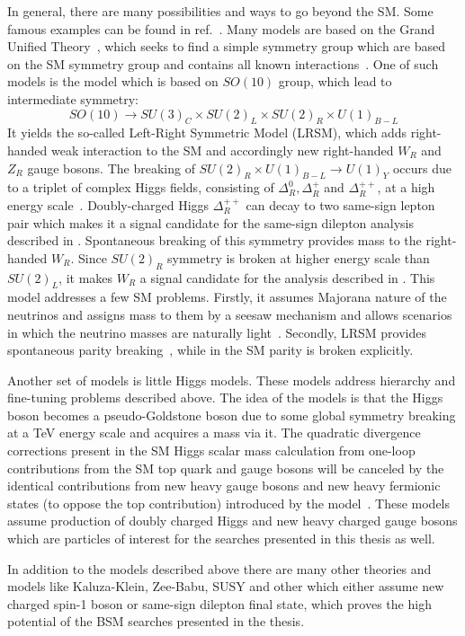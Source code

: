 In general, there are many possibilities and ways to go beyond the SM. 
Some famous examples can be found in ref.~\cite{Ellis:2011jb}.
Many models are based on the Grand Unified Theory~\cite{GUT_bigPaper},
which seeks to find a simple symmetry group which are based on the SM symmetry group
and contains all known interactions~\cite{Langacker:1984dc,Cvetic:1995zs}.
One of such models is the model which is based on $SO(10)$ group, which lead to intermediate symmetry:
\begin{equation}
SO(10) \to SU(3)_C \times SU(2)_L \times SU(2)_R \times U(1)_{B-L}
\end{equation}
It yields the so-called Left-Right Symmetric Model (LRSM), which adds
right-handed weak interaction to the SM and accordingly new right-handed $W_R$ and $Z_R$ gauge bosons.
The breaking of $SU(2)_R \times U(1)_{B-L} \to U(1)_Y$ occurs due to a triplet of complex Higgs fields, consisting of $\Delta^0_R, \Delta^+_R$ and $\Delta^{++}_R$, at a high energy scale~\cite{Azuelos:2004mwa}.
Doubly-charged Higgs $\Delta^{++}_R$ can decay to two same-sign lepton pair which makes it a signal candidate for the same-sign dilepton analysis described in . Spontaneous breaking of this symmetry provides mass to the right-handed $W_R$.
Since $SU(2)_R$ symmetry is broken at higher energy scale than $SU(2)_L$, it makes
$W_R$ a signal candidate for the analysis described in .
This model addresses a few SM problems. Firstly, it assumes Majorana nature of the neutrinos and assigns mass to them by a seesaw mechanism and allows scenarios in which the neutrino masses are naturally light~\cite{Mohapatra:1979ia}. 
Secondly, LRSM provides spontaneous parity breaking~\cite{Grimus:1993fx}, while in the SM parity is broken explicitly.

Another set of models is little Higgs models.
These models address hierarchy and fine-tuning problems described above.
The idea of the models is that the Higgs boson becomes a pseudo-Goldstone boson due to some global symmetry breaking at a TeV energy scale and acquires a mass via it.
The quadratic divergence corrections present in the SM Higgs scalar mass calculation from one-loop contributions from the SM top quark and gauge bosons will be canceled 
by the identical contributions from new heavy gauge bosons and new heavy fermionic states (to oppose the top contribution) introduced by the model~\cite{Han:2003wu,Brak}.
These models assume production of doubly charged Higgs and new heavy charged gauge bosons which are particles of interest for the searches presented in this thesis as well.

In addition to the models described above there are many other theories and models like Kaluza-Klein, Zee-Babu, SUSY and other which either assume new charged spin-1 boson or same-sign dilepton final state, which proves the high potential of the BSM searches presented in the thesis.